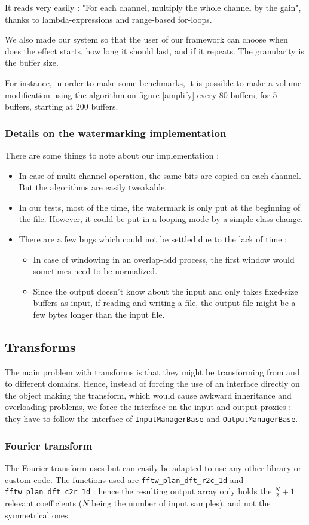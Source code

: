 It reads very easily : "For each channel, multiply the whole channel by the gain", thanks to lambda-expressions and range-based for-loops.

We also made our system so that the user of our framework can choose when does the effect starts, how long it should last, and if it repeats. The granularity is the buffer size.

For instance, in order to make some benchmarks, it is possible to make a volume modification using the algorithm on figure \ref{amplify} every 80 buffers, for 5 buffers, starting at 200 buffers.
\subsubsection{Details on the watermarking implementation}
There are some things to note about our implementation : 
\begin{itemize}
\item In case of multi-channel operation, the same bits are copied on each channel. But the algorithms are easily tweakable.
\item In our tests, most of the time, the watermark is only put at the beginning of the file. However, it could be put in a looping mode by a simple class change.
\item There are a few bugs which could not be settled due to the lack of time : 
\begin{itemize}
\item In case of windowing in an overlap-add process, the first window would sometimes need to be normalized.
\item Since the output doesn't know about the input and only takes fixed-size buffers as input, if reading and writing a file, the output file might be a few bytes longer than the input file.
\end{itemize}
\end{itemize}
\subsection{Transforms}
The main problem with transforms is that they might be transforming from and to different domains.
Hence, instead of forcing the use of an interface directly on the object making the transform, which would cause awkward inheritance and overloading problems, we force the interface on the input and output proxies : they have to follow the interface of \texttt{InputManagerBase} and \texttt{OutputManagerBase}.

\subsubsection{Fourier transform}
The Fourier transform uses  but can easily be adapted to use any other library or custom code.
The functions used are \texttt{fftw\_plan\_dft\_r2c\_1d} and \texttt{fftw\_plan\_dft\_c2r\_1d} : hence the resulting output array 
only holds the $\frac{N}{2} + 1$ relevant coefficients ($N$ being the number of input samples), and not the symmetrical ones.


